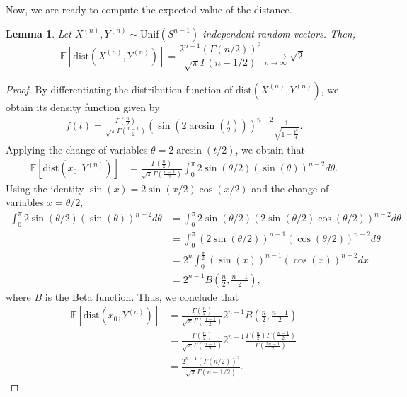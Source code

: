 \documentclass[10pt]{amsart}
\newtheorem{lemma}{Lemma}[section]
\newcounter{theor}
\def\dist{\text{dist}}
\numberwithin{equation}{section}
\begin{document}
Now, we are ready to compute the expected value of the distance.

\begin{lemma}
\label{Lem:ExpectedValueHypersphere}
Let $X^{(n)},Y^{(n)} \sim \text{Unif}( S^{n-1})$ independent random vectors. Then, 
$$ \mathbb{E} [ \dist(X^{(n)},Y^{(n)})] = \frac{2^{n-1} \left( \Gamma(n/2) \right)^2}{\sqrt{\pi}\Gamma(n-1/2)}  \underset{n \to \infty}{ \longrightarrow} \sqrt{2}. $$
\end{lemma}
\begin{proof}
By differentiating the distribution function of $\dist ( X^{(n)} , Y^{(n)})$, we obtain its density function given by
\begin{align*}
f(t) = \frac{\Gamma ( \frac{n}{2} ) }{ \sqrt{\pi} \Gamma ( \frac{n-1}{2} )} \left( \sin \left( 2 \arcsin \left( \frac{t}{2} \right) \right) \right)^{n-2} \frac{1}{\sqrt{1-\frac{t^2}{4}}} .
\end{align*}
Applying the change of variables $\theta = 2 \arcsin ( t/2 )$, we obtain that
\begin{align*}
\mathbb{E}[\dist(x_0 , Y^{(n)})] & = \frac{\Gamma ( \frac{n}{2} ) }{ \sqrt{\pi} \Gamma ( \frac{n-1}{2} )} \int_0^{\pi} 2\sin{(\theta/2)} (\sin (\theta))^{n-2} d\theta  .
\end{align*}
Using the identity $\sin (x) = 2 \sin (x/2) \cos (x/2)$ and the change of variables $x=\theta/2$,
\begin{align*}
\int_0^{\pi} 2\sin{(\theta/2)} (\sin (\theta))^{n-2} d\theta & = 
\int_0^{\pi} 2\sin{(\theta/2)} (2 \sin (\theta/2) \cos (\theta/2))^{n-2} d\theta
 \\
 & = \int_0^{\pi} ( 2\sin{(\theta/2)} ) ^{n-1} ( \cos ( \theta /2))^{n-2} d\theta
 \\
 & = 2^{n} \int_0^{\frac{\pi}{2}} ( \sin ( x ) ) ^{n-1} ( \cos (x))^{n-2} dx
  \\
  & = 2^{n-1} B \left( \frac{n}{2} , \frac{n-1}{2}  \right),
\end{align*}
where $B$ is the Beta function. Thus, we conclude that 
\begin{align*}
\mathbb{E}[\dist(x_0 , Y^{(n)})] & = \frac{\Gamma ( \frac{n}{2} ) }{ \sqrt{\pi} \Gamma ( \frac{n-1}{2} )} 2^{n-1} B \left( \frac{n}{2} , \frac{n-1}{2}  \right) 
 \\
 & = \frac{\Gamma ( \frac{n}{2} ) }{ \sqrt{\pi} \Gamma ( \frac{n-1}{2} )} 2^{n-1} 
 \frac{\Gamma ( \frac{n}{2} ) \Gamma ( \frac{n-1}{2} ) }{ \Gamma ( \frac{2n - 1}{2} )}
 \\
 & = \frac{2^{n-1} \left( \Gamma(n/2) \right)^2}{\sqrt{\pi}\Gamma(n-1/2)}.

\end{align*}
\end{proof}
\end{document}
